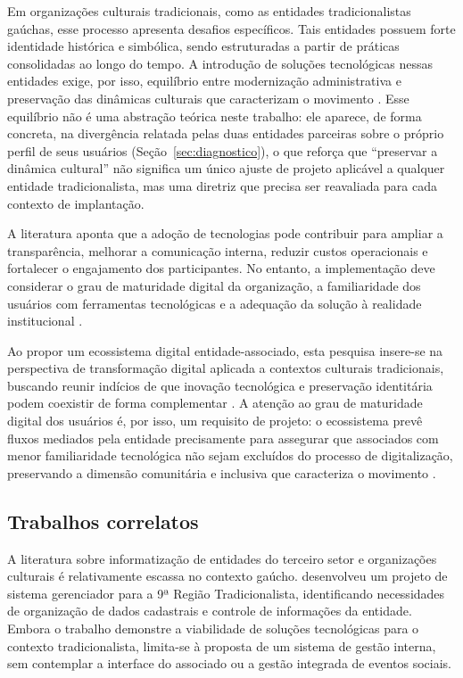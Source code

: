 \documentclass[12pt,a4paper]{article}
\begin{document}
Em organizações culturais tradicionais, como as entidades tradicionalistas gaúchas, esse processo
apresenta desafios específicos. Tais entidades possuem forte identidade histórica e simbólica, sendo
estruturadas a partir de práticas consolidadas ao longo do tempo. A introdução de soluções
tecnológicas nessas entidades exige, por isso, equilíbrio entre modernização administrativa e
preservação das dinâmicas culturais que caracterizam o movimento \parencite{warnerwager2019}. Esse equilíbrio não é uma
abstração teórica neste trabalho: ele aparece, de forma concreta, na divergência relatada pelas duas
entidades parceiras sobre o próprio perfil de seus usuários (Seção~\ref{sec:diagnostico}), o que
reforça que ``preservar a dinâmica cultural'' não significa um único ajuste de projeto aplicável a
qualquer entidade tradicionalista, mas uma diretriz que precisa ser reavaliada para cada contexto de
implantação.

A literatura aponta que a adoção de tecnologias pode contribuir para ampliar a transparência,
melhorar a comunicação interna, reduzir custos operacionais e fortalecer o engajamento dos
participantes. No entanto, a implementação deve considerar o grau de maturidade digital da
organização, a familiaridade dos usuários com ferramentas tecnológicas e a adequação da solução à
realidade institucional \parencite{verhoef2021}.

Ao propor um ecossistema digital entidade-associado, esta pesquisa insere-se na perspectiva de
transformação digital aplicada a contextos culturais tradicionais, buscando reunir indícios de que
inovação tecnológica e preservação identitária podem coexistir de forma complementar
\parencite{hinings2018}. A atenção ao grau de maturidade digital dos usuários é, por isso, um requisito
de projeto: o ecossistema prevê fluxos mediados pela entidade precisamente para
assegurar que associados com menor familiaridade tecnológica não sejam excluídos do processo de
digitalização, preservando a dimensão comunitária e inclusiva que caracteriza o movimento
\parencite{vial2019,warnerwager2019}.

\subsection{Trabalhos correlatos}

A literatura sobre informatização de entidades do terceiro setor e organizações culturais é
relativamente escassa no contexto gaúcho. \textcite{jardim2022} desenvolveu um projeto de sistema
gerenciador para a 9ª Região Tradicionalista, identificando necessidades de organização de dados
cadastrais e controle de informações da entidade. Embora o trabalho demonstre a viabilidade de
soluções tecnológicas para o contexto tradicionalista, limita-se à proposta de um sistema de gestão
interna, sem contemplar a interface do associado ou a gestão integrada de eventos sociais.
\end{document}
